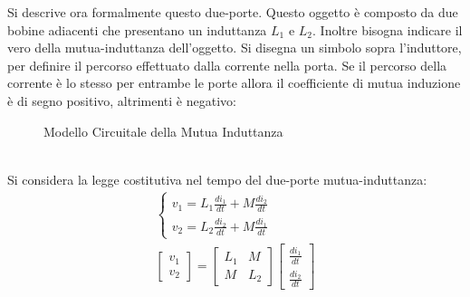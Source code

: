 \documentclass{article}
\numberwithin{equation}{subsection}
\begin{document}
Si descrive ora formalmente questo due-porte. Questo oggetto è composto da due bobine adiacenti che presentano un induttanza $L_1$ e $L_2$. Inoltre 
bisogna indicare il vero della mutua-induttanza dell'oggetto. Si disegna un simbolo sopra l'induttore, per definire il percorso effettuato dalla corrente nella porta. 
Se il percorso della corrente è lo stesso per entrambe le porte allora il coefficiente di mutua induzione è di segno positivo, altrimenti è negativo:
\begin{figure}[h!]%
    \centering
    \qquad
    \caption{Modello Circuitale della Mutua Induttanza}
    \label{fig:mutua-induttanza}
\end{figure}
\\
Si considera la legge costitutiva nel tempo del due-porte mutua-induttanza:
\begin{gather*}
    \begin{cases}
        v_1=L_1\displaystyle\frac{di_1}{dt}+M\frac{di_2}{dt}\\
        v_2=L_2\displaystyle\frac{di_2}{dt}+M\frac{di_1}{dt}
    \end{cases}\\
    \begin{bmatrix}
        v_1\\v_2
    \end{bmatrix}=\begin{bmatrix}
        L_1&M\\M&L_2
    \end{bmatrix}\begin{bmatrix}
        \displaystyle\frac{di_1}{dt}\\ \displaystyle\frac{di_2}{dt}
    \end{bmatrix}
\end{gather*}
\end{document}
